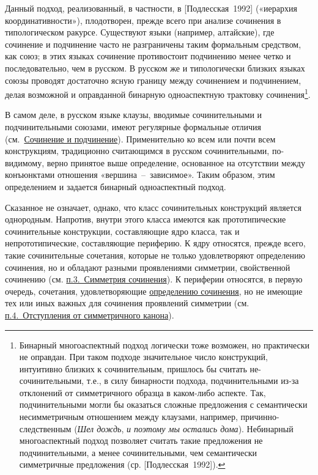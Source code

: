 Данный подход, реализованный, в частности, в {[}Подлесская~1992{]}
(«иерархия координативности»), плодотворен, прежде всего при анализе
сочинения в типологическом ракурсе. Существуют языки (например,
алтайские), где сочинение и подчинение часто не разграничены таким
формальным средством, как союз; в этих языках сочинение противостоит
подчинению менее четко и последовательно, чем в русском. В русском же и
типологически близких языках союзы проводят достаточно ясную границу
между сочинением и подчинением, делая возможной и оправданной бинарную
одноаспектную трактовку сочинения\footnote{Бинарный многоаспектный
подход логически тоже возможен, но практически не оправдан. При таком
подходе значительное число конструкций, интуитивно близких к
сочинительным, пришлось бы считать не-сочинительными, т.е., в силу
бинарности подхода, подчинительными из-за отклонений от симметричного
образца в каком-либо аспекте. Так, подчинительными могли бы оказаться
сложные предложения с семантически несимметричным отношением между
клаузами, например, причинно-следственным (\textit{Шел дождь}, \textit{и
  поэтому мы остались дома}). Небинарный многоаспектный подход позволяет
считать такие предложения не подчинительными, а менее сочинительными,
чем семантически симметричные предложения (ср. {[}Подлесская~1992{]}).}.

В самом деле, в русском языке клаузы, вводимые сочинительными и
подчинительными союзами, имеют регулярные формальные отличия
(см.~\underline{Сочинение и подчинение}). Применительно ко всем или
почти всем конструкциям, традиционно считающимся в русском
сочинительными, по-видимому, верно принятое выше определение, основанное
на отсутствии между конъюнктами отношения «вершина~--~зависимое». Таким
образом, этим определением и задается бинарный одноаспектный подход.

Сказанное не означает, однако, что класс сочинительных конструкций
является однородным. Напротив, внутри этого класса имеются как
прототипические сочинительные конструкции, составляющие ядро класса, так
и непрототипические, составляющие периферию. К ядру относятся, прежде
всего, такие сочинительные сочетания, которые не только удовлетворяют
определению сочинения, но и обладают разными проявлениями симметрии,
свойственной сочинению (см. \underline{п.3.~Симметрия сочинения}). К
периферии относятся, в первую очередь, сочетания, удовлетворяющие
\underline{определению сочинения}, но не имеющие тех или иных важных для
сочинения проявлений симметрии (см. \underline{п.4.~Отступления от
  симметричного канона}).

